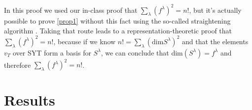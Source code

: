 \documentclass[12pt,twoside]{reedthesis}
\theoremstyle{plain}   %
\theoremstyle{definition}
\theoremstyle{remark}
\numberwithin{equation}{section}
\def\dim{\mathrm{dim}}
\begin{document}
   In this proof we used our in-class proof that $\sum_\lambda(f^\lambda)^2 = n!$, but it's actually possible to prove \cref{prop1}
   without this fact using the so-called straightening algorithm \cite[Chapter 7.4]{fulton}.
   Taking that route leads to a representation-theoretic proof that $\sum_\lambda(f^\lambda)^2 = n!$,
   because if we know $n! = \sum_\lambda (\dim S^\lambda)^2$ and that the elements $v_T$ over SYT form a basis for $S^\lambda$,
   we can conclude that $\dim(S^\lambda) = f^\lambda$ and therefore $\sum_\lambda(f^\lambda)^2 = n!$. \par
   



   \chapter{Results}
\end{document}
